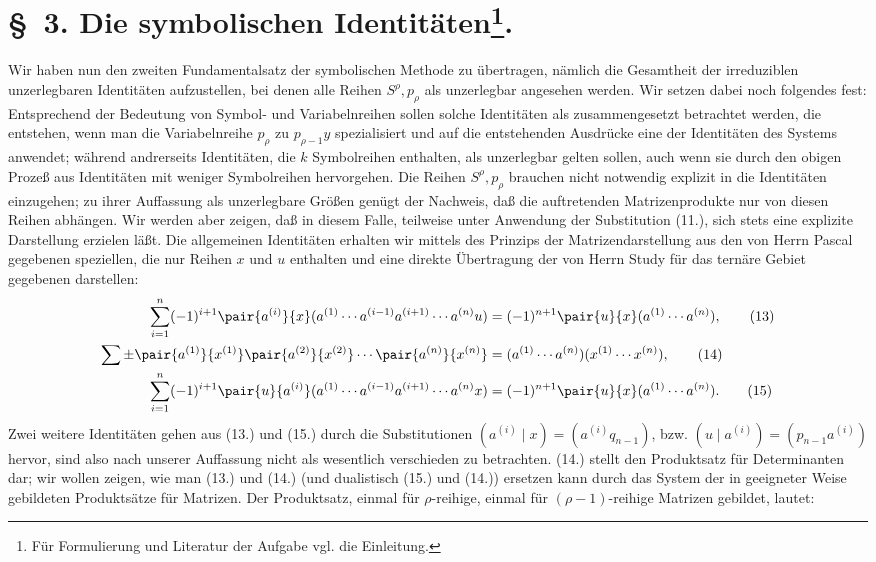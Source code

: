\section*{\S\ 3. Die symbolischen Identitäten\footnote{Für Formulierung und Literatur der Aufgabe vgl. die Einleitung.}.}
Wir haben nun den zweiten Fundamentalsatz der symbolischen Methode zu übertragen, nämlich die Gesamtheit der irreduziblen unzerlegbaren Identitäten aufzustellen, bei denen alle Reihen $S^\rho,p_\rho$ als unzerlegbar angesehen werden. Wir setzen dabei noch folgendes fest: Entsprechend der Bedeutung von Symbol- und Variabelnreihen sollen solche Identitäten als zusammengesetzt betrachtet werden, die entstehen, wenn man die Variabelnreihe $p_\rho$ zu $p_{\rho-1}y$ spezialisiert und auf die entstehenden Ausdrücke eine der Identitäten des Systems anwendet; während andrerseits Identitäten, die $k$ Symbolreihen enthalten, als unzerlegbar gelten sollen, auch wenn sie durch den obigen Prozeß aus Identitäten mit weniger Symbolreihen hervorgehen. Die Reihen $S^\rho,p_\rho$ brauchen nicht notwendig explizit in die Identitäten einzugehen; zu ihrer Auffassung als unzerlegbare Größen genügt der Nachweis, daß die auftretenden Matrizenprodukte nur von diesen Reihen abhängen. Wir werden aber zeigen, daß in diesem Falle, teilweise unter Anwendung der Substitution (11.), sich stets eine explizite Darstellung erzielen läßt. Die allgemeinen Identitäten erhalten wir mittels des Prinzips der Matrizendarstellung aus den von Herrn Pascal gegebenen speziellen, die nur Reihen $x$ und $u$ enthalten und eine direkte Übertragung der von Herrn Study für das ternäre Gebiet gegebenen darstellen:
\begin{align}
\sum_{i=1}^n(-1)^{i+1}\pair{a^{(i)}}{x}(a^{(1)}\cdots a^{(i-1)}a^{(i+1)}\cdots a^{(n)}u)&=(-1)^{n+1}\pair{u}{x}(a^{(1)}\cdots a^{(n)}),\tag{13}\\
\sum\pm\pair{a^{(1)}}{x^{(1)}}\pair{a^{(2)}}{x^{(2)}}\cdots\pair{a^{(n)}}{x^{(n)}}&=(a^{(1)}\cdots a^{(n)})(x^{(1)}\cdots x^{(n)}),\tag{14}\\
\sum_{i=1}^n(-1)^{i+1}\pair{u}{a^{(i)}}(a^{(1)}\cdots a^{(i-1)}a^{(i+1)}\cdots a^{(n)}x)&=(-1)^{n+1}\pair{u}{x}(a^{(1)}\cdots a^{(n)}).\tag{15}
\end{align}
Zwei weitere Identitäten gehen aus (13.) und (15.) durch die Substitutionen $(a^{(i)}\mid x)=(a^{(i)}q_{n-1})$, bzw. $(u\mid a^{(i)})=(p_{n-1}a^{(i)})$ hervor, sind also nach unserer Auffassung nicht als wesentlich verschieden zu betrachten. (14.) stellt den Produktsatz für Determinanten dar; wir wollen zeigen, wie man (13.) und (14.) (und dualistisch (15.) und (14.)) ersetzen kann durch das System der in geeigneter Weise gebildeten Produktsätze für Matrizen. Der Produktsatz, einmal für $\rho$-reihige, einmal für $(\rho-1)$-reihige Matrizen gebildet, lautet:

